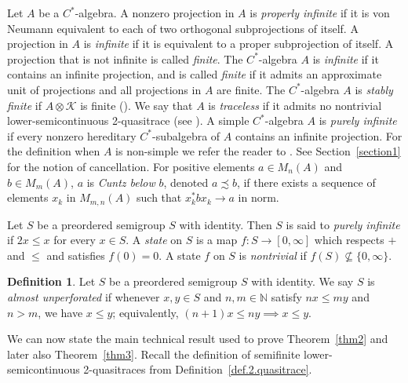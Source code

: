 \documentclass[a4paper, 12pt]{amsart}
\numberwithin{equation}{section}
\newcounter{theorem}
\theoremstyle{remark}
\theoremstyle{definition}
\newtheorem{defn}[theorem]{Definition}
\begin{document}
Let $A$ be a $C^*$-algebra. A nonzero projection in $A$ is \emph{properly infinite} if it
is von Neumann equivalent to each of two orthogonal subprojections of itself. A
projection in $A$ is \emph{infinite} if it is equivalent to a proper subprojection of
itself. A projection that is not infinite is called \emph{finite}. The $C^*$-algebra $A$
is \emph{infinite} if it contains an infinite projection, and is called \emph{finite} if
it admits an approximate unit of projections and all projections in $A$ are finite. The $C^*$-algebra $A$ is  \emph{stably finite} if $A\otimes {\mathcal{K}}$ is finite (\cite[p.~7]{MR1878881}). We say
that $A$ is \emph{traceless} if it admits no nontrivial lower-semicontinuous 2-quasitrace
(see \cite[p.~463]{MR2032998}). A simple $C^*$-algebra $A$ is \emph{purely infinite} if
every nonzero hereditary $C^*$-subalgebra of $A$ contains an infinite projection. For
the definition when $A$ is non-simple we refer the reader to \cite{MR1759891}. See
Section~\ref{section1} for the notion of cancellation. For positive elements $a\in
M_n(A)$ and $b\in M_m(A)$, $a$ is \emph{Cuntz below} $b$, denoted $a\precsim b$, if there
exists a sequence of elements $x_k$ in $M_{m,n}(A)$ such that $x_k^* b x_k\to a$ in norm.

Let $S$ be a preordered semigroup $S$ with identity. Then $S$ is said to \emph{purely
infinite} if $2x\leq x$ for every $x\in S$. A \emph{state} on $S$ is a map $f \colon
S\to [0,\infty]$ which respects $+$ and $\leq$ and satisfies $f(0)=0$. A state $f$ on $S$ is
\emph{nontrivial} if $f(S) \not\subseteq \{0,\infty\}$.
\begin{defn}\label{alm.unper}
Let $S$ be a preordered semigroup $S$ with identity.
We say $S$ is \emph{almost unperforated} if
whenever $x, y \in S$ and $n, m \in {\mathbb{N}}$ satisfy $nx \leq my$ and $n > m$, we have $x\leq
y$; equivalently, $(n+1)x \le ny \implies x \le y$.
\end{defn}

We can now state the main technical result used to prove Theorem~\ref{thm2} and later
also Theorem~\ref{thm3}. Recall the definition of semifinite lower-semicontinuous
2-quasitraces from Definition~\ref{def.2.quasitrace}.
\end{document}
